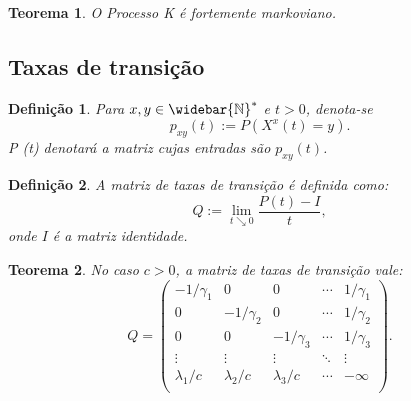 \documentclass[xcolor=pdftex,dvipsnames]{beamer}
\newcommand{\Nzb}{{\mathbb{\widebar{N}^*}}}
\newtheorem{teorema}{Teorema}
\newtheorem{definicao}{Definição}
\begin{document}
\begin{frame}
  \begin{teorema}
    O Processo K é fortemente markoviano.
  \end{teorema}
\end{frame}


\subsection{Taxas de transição}

\begin{frame}
  \begin{definicao}
    Para $x, y \in \Nzb$ e $t > 0$, denota-se
    \begin{displaymath}
      p_{x y} (t) := P \left( X^x(t) = y \right).
    \end{displaymath}
    P (t) denotará a matriz cujas entradas são $p_{x y} (t)$.
  \end{definicao} \pause
  \begin{definicao}
    A matriz de taxas de transição é definida como:
    \begin{displaymath}
      Q := \lim_{t \searrow 0} \frac{P(t) - I}{t},
    \end{displaymath}
    onde $I$ é a matriz identidade.
  \end{definicao}
\end{frame}

\begin{frame}
  \begin{teorema}
    No caso $c > 0$, a matriz de taxas de transição vale:
    \begin{displaymath}
      Q = \left(
        \begin{array}{ccccc}
          -1/\gamma_1 & 0 & 0 & \cdots & 1/\gamma_1\\
          0 & -1/\gamma_2 & 0 & \cdots & 1/\gamma_2\\
          0 & 0 & -1/\gamma_3 & \cdots & 1/\gamma_3\\
          \vdots & \vdots & \vdots & \ddots & \vdots \\
          \lambda_1/c & \lambda_2/c &
          \lambda_3/c & \cdots & -\infty\\
        \end{array}
      \right).
    \end{displaymath}
  \end{teorema}
\end{frame}
\end{document}
